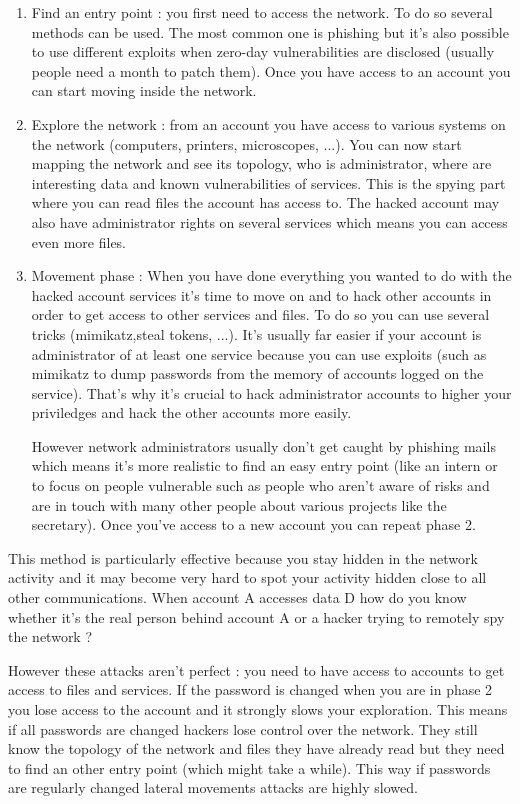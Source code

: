 \documentclass[11pt]{article}
\begin{document}
\begin{enumerate}
\item Find an entry point : you first need to access the network. To do so several methods can be used. The most common one is phishing but it's also possible to use different exploits when zero-day vulnerabilities are disclosed (usually people need a month to patch them). Once you have access to an account you can start moving inside the network.
\item Explore the network : from an account you have access to various systems on the network (computers, printers, microscopes, ...). You can now start mapping the network and see its topology, who is administrator, where are interesting data and known vulnerabilities of services. This is the spying part where you can read files the account has access to. The hacked account may also have administrator rights on several services which means you can access even more files.\\
\item Movement phase : When you have done everything you wanted to do with the hacked account services it's time to move on and to hack other accounts in order to get access to other services and files. To do so you can use several tricks (mimikatz,steal tokens, ...). It's usually far easier if your account is administrator of at least one service because you can use exploits (such as mimikatz to dump passwords from the memory of accounts logged on the service). That's why it's crucial to hack administrator accounts to higher your priviledges and hack the other accounts more easily. 

However network administrators usually don't get caught by phishing mails which means it's more realistic to find an easy entry point (like an intern or to focus on people vulnerable such as people who aren't aware of risks and are in touch with many other people about various projects like the secretary). Once you've access to a new account you can repeat phase 2.
\end{enumerate}
This method is particularly effective because you stay hidden in the network activity and it may become very hard to spot your activity hidden close to all other communications. When account A accesses data D how do you know whether it's the real person behind account A or a hacker trying to remotely spy the network ? 

However these attacks aren't perfect : you need to have access to accounts to get access to files and services. If the password is changed when you are in phase 2 you lose access to the account and it strongly slows your exploration. This means if all passwords are changed hackers lose control over the network. They still know the topology of the network and files they have already read but they need to find an other entry point (which might take a while). This way if passwords are regularly changed lateral movements attacks are highly slowed. 
\end{document}
